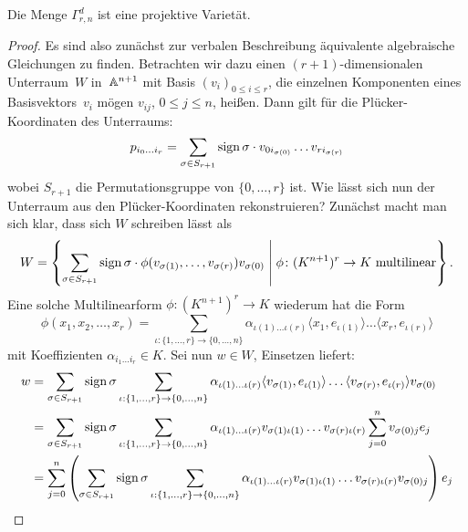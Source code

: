 \begin{fact} \label{fact:gammaproj}
Die Menge $\Gamma_{r,n}^d$ ist eine projektive Varietät.
\end{fact}
\begin{proof}
Es sind also zunächst zur verbalen Beschreibung äquivalente algebraische Gleichungen zu finden. Betrachten wir dazu einen $(r+1)$-dimensionalen Unterraum~$W$ in~$\mathbb A^{n+1}$ mit Basis $(v_i)_{0 \leq i \leq r}$, die einzelnen Komponenten eines Basisvektors~$v_i$ mögen $v_{ij}$, $0 \leq j \leq n$, heißen. Dann gilt für die Plücker-Koordinaten des Unterraums:
\begin{equation}
p_{i_0 \dots i_r} = \sum_{\sigma \in S_{r+1}} \operatorname{sign} \sigma \cdot v_{0i_{\sigma(0)}} \dots v_{ri_{\sigma(r)}}
\end{equation}
wobei $S_{r+1}$ die Permutationsgruppe von $\{0,\dots,r\}$ ist. Wie lässt sich nun der Unterraum aus den Plücker-Koordinaten rekonstruieren? Zunächst macht man sich klar, dass sich $W$ schreiben lässt als
\begin{equation}
W = \left\{ \sum\limits_{\sigma \in S_{r+1}} \operatorname{sign} \sigma \cdot \phi(v_{\sigma(1)}, \dots, v_{\sigma(r)}) v_{\sigma(0)} \;\middle|\; \phi \colon (K^{n+1})^r \rightarrow K \text{ multilinear} \right\}.
\end{equation}
Eine solche Multilinearform $\phi \colon (K^{n+1})^r \to K$ wiederum hat die Form
\begin{equation}
\phi(x_1, x_2, \dots, x_r) = \sum_{\iota: \{1, \dots, r\} \to \{0, \dots, n\}} \alpha_{\iota(1) \dots \iota(r)} \langle x_1, e_{\iota(1)} \rangle \dots \langle x_r, e_{\iota(r)} \rangle
\end{equation}
mit Koeffizienten $\alpha_{i_1 \dots i_r} \in K$. Sei nun $w \in W$, Einsetzen liefert:
\begin{align*}
w &= \sum\limits_{\sigma \in S_{r+1}} \sign \sigma \sum_{\iota: \{1, \dots, r\} \to \{0, \dots, n\}} \alpha_{\iota(1) \dots \iota(r)} \langle v_{\sigma(1)}, e_{\iota(1)} \rangle \dots \langle v_{\sigma(r)}, e_{\iota(r)} \rangle v_{\sigma(0)} \\
	&= \sum\limits_{\sigma \in S_{r+1}} \sign \sigma \sum_{\iota: \{1, \dots, r\} \to \{0, \dots, n\}} \alpha_{\iota(1) \dots \iota(r)} v_{\sigma(1)\iota(1)} \dots v_{\sigma(r)\iota(r)} \sum_{j=0}^n v_{\sigma(0)j} e_j \\
	&= \sum_{j=0}^n \left(\sum\limits_{\sigma \in S_{r+1}} \sign \sigma \sum_{\iota: \{1, \dots, r\} \to \{0, \dots, n\}} \alpha_{\iota(1) \dots \iota(r)} v_{\sigma(1)\iota(1)} \dots v_{\sigma(r)\iota(r)} v_{\sigma(0)j}\right) e_j \\

\end{align*}
\end{proof}
